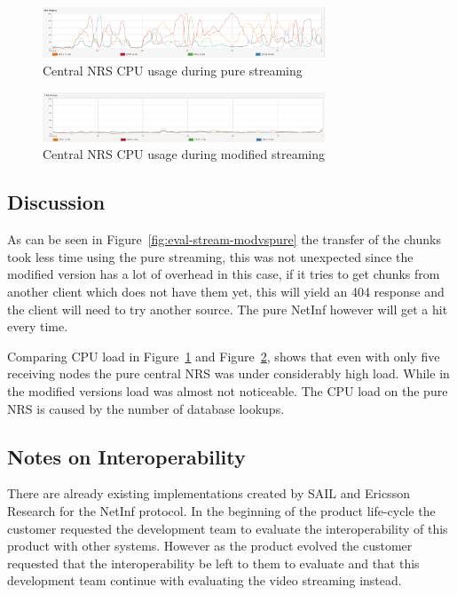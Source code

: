 \begin{figure}[h!]
	\centering
		\includegraphics[width=0.75\textwidth]{./img/eval-stream-pure-cpu.png}
    	\caption{Central NRS CPU usage during pure streaming}
	\label{fig:eval-stream-pure-cpu}
\end{figure}

\begin{figure}[h!]
	\centering
		\includegraphics[width=0.75\textwidth]{./img/eval-stream-mod-cpu.png}
    	\caption{Central NRS CPU usage during modified streaming}
	\label{fig:eval-stream-mod-cpu}
\end{figure}

\subsection{Discussion}
As can be seen in Figure~\ref{fig:eval-stream-modvspure} the transfer of the chunks 
took less time using the pure streaming, this was not unexpected since the modified version has a lot of overhead in this case, 
if it tries to get chunks from another client which does not have them yet, 
this will yield an 404 response and the client will need to try another source. 
The pure NetInf however will get a hit every time. 

Comparing CPU load in Figure~\ref{fig:eval-stream-pure-cpu} and Figure~\ref{fig:eval-stream-mod-cpu}, 
shows that even with only five receiving nodes the pure central NRS was under considerably high load.
While in the modified versions load was almost not noticeable. The CPU load on the pure NRS is caused by  
the number of database lookups. 

\subsection{Notes on Interoperability}

There are already existing implementations created by SAIL and Ericsson Research 
for the NetInf protocol. In the beginning of the product 
life-cycle the customer requested the development team to evaluate the interoperability 
of this product with other systems. However as the product evolved the customer requested 
that the interoperability be left to them to evaluate and that this development team 
continue with evaluating the video streaming instead.

